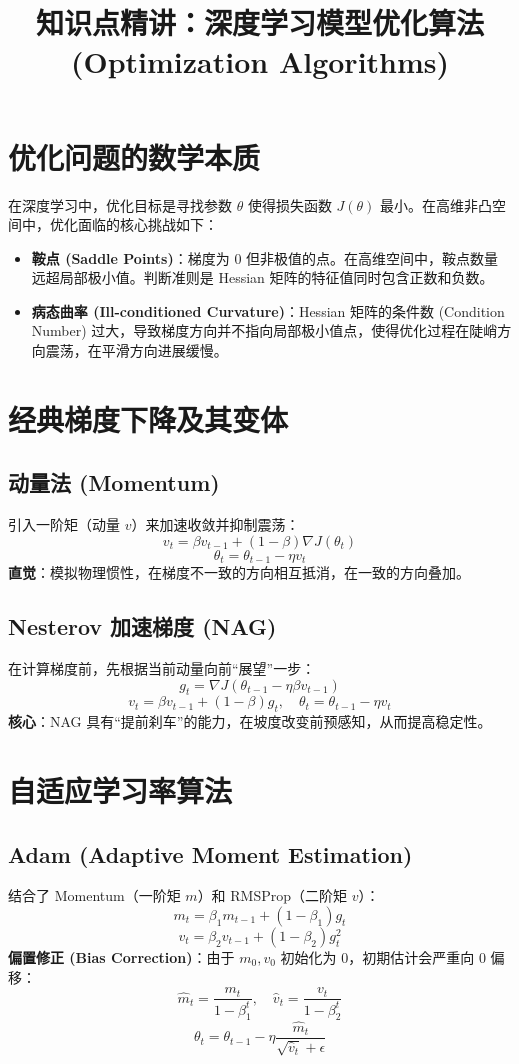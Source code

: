 \documentclass[12pt, a4paper]{article}
\title{知识点精讲：深度学习模型优化算法 (Optimization Algorithms)}
\author{}
\date{}
\begin{document}
\maketitle

\section{优化问题的数学本质}
在深度学习中，优化目标是寻找参数 $\theta$ 使得损失函数 $J(\theta)$ 最小。在高维非凸空间中，优化面临的核心挑战如下：

\begin{itemize}
    \item \textbf{鞍点 (Saddle Points)}：梯度为 0 但非极值的点。在高维空间中，鞍点数量远超局部极小值。判断准则是 Hessian 矩阵的特征值同时包含正数和负数。
    \item \textbf{病态曲率 (Ill-conditioned Curvature)}：Hessian 矩阵的条件数 (Condition Number) 过大，导致梯度方向并不指向局部极小值点，使得优化过程在陡峭方向震荡，在平滑方向进展缓慢。
\end{itemize}

\section{经典梯度下降及其变体}

\subsection{动量法 (Momentum)}
引入一阶矩（动量 $v$）来加速收敛并抑制震荡：
$$ v_t = \beta v_{t-1} + (1-\beta) \nabla J(\theta_t) $$
$$ \theta_t = \theta_{t-1} - \eta v_t $$
\textbf{直觉}：模拟物理惯性，在梯度不一致的方向相互抵消，在一致的方向叠加。

\subsection{Nesterov 加速梯度 (NAG)}
在计算梯度前，先根据当前动量向前“展望”一步：
$$ g_t = \nabla J(\theta_{t-1} - \eta \beta v_{t-1}) $$
$$ v_t = \beta v_{t-1} + (1-\beta) g_t, \quad \theta_t = \theta_{t-1} - \eta v_t $$
\textbf{核心}：NAG 具有“提前刹车”的能力，在坡度改变前预感知，从而提高稳定性。

\section{自适应学习率算法}

\subsection{Adam (Adaptive Moment Estimation)}
结合了 Momentum（一阶矩 $m$）和 RMSProp（二阶矩 $v$）：
$$ m_t = \beta_1 m_{t-1} + (1-\beta_1)g_t $$
$$ v_t = \beta_2 v_{t-1} + (1-\beta_2)g_t^2 $$
\textbf{偏置修正 (Bias Correction)}：由于 $m_0, v_0$ 初始化为 0，初期估计会严重向 0 偏移：
$$ \hat{m}_t = \frac{m_t}{1-\beta_1^t}, \quad \hat{v}_t = \frac{v_t}{1-\beta_2^t} $$
$$ \theta_t = \theta_{t-1} - \eta \frac{\hat{m}_t}{\sqrt{\hat{v}_t} + \epsilon} $$
\end{document}

